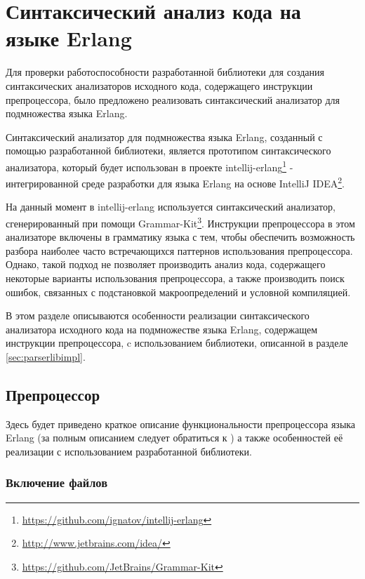 \clearpage

\section{Синтаксический анализ кода на языке Erlang}
\label{sec:erlang}

Для проверки работоспособности разработанной библиотеки для создания синтаксических анализаторов исходного кода, содержащего инструкции препроцессора, было предложено реализовать синтаксический анализатор для подмножества языка Erlang. 

Синтаксический анализатор для подмножества языка Erlang, созданный с помощью разработанной библиотеки, является прототипом синтаксического анализатора, который будет использован в проекте intellij-erlang\footnote{\url{https://github.com/ignatov/intellij-erlang}} - интегрированной среде разработки для языка Erlang на основе IntelliJ IDEA\footnote{\url{http://www.jetbrains.com/idea/}}.

На данный момент в intellij-erlang используется синтаксический анализатор, сгенерированный при помощи Grammar-Kit\footnote{\url{https://github.com/JetBrains/Grammar-Kit}}. Инструкции препроцессора в этом анализаторе включены в грамматику языка с тем, чтобы обеспечить возможность разбора наиболее часто встречающихся паттернов использования препроцессора. Однако, такой подход не позволяет производить анализ кода, содержащего некоторые варианты использования препроцессора, а также производить поиск ошибок, связанных с подстановкой макроопределений и условной компиляцией. 

В этом разделе описываются особенности реализации синтаксического анализатора исходного кода на подмножестве языка Erlang, содержащем инструкции препроцессора, c использованием библиотеки, описанной в разделе \ref{sec:parserlibimpl}.

\subsection{Препроцессор}

Здесь будет приведено краткое описание функциональности препроцессора языка Erlang (за полным описанием следует обратиться к \cite{erlangpreprocessor}) а также особенностей её реализации с использованием разработанной библиотеки.

\subsubsection{Включение файлов}

